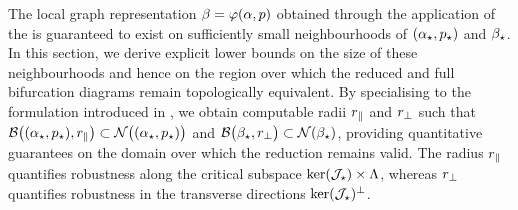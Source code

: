 \documentclass[a4paper]{cas-dc}
\begin{document}
The local graph representation \(\B = \varphi(\A,p)\) obtained through the application of the \ImFT{} is guaranteed to exist on sufficiently small neighbourhoods of \((\A_{\star},p_{\star})\) and \(\B_{\star}\). In this section, we derive explicit lower bounds on the size of these neighbourhoods and hence on the region over which the reduced and full bifurcation diagrams remain topologically equivalent. By specialising  to the \LSR{} formulation introduced in , we obtain computable radii \(\rpr\) and \(\rpp\) such that \(\Bpara[\rpr] \subset \mathcal{N}\bigl((\A_{\star},p_{\star})\bigr)\) and \(\Bperp[\rpp] \subset \mathcal{N}(\B_{\star})\), providing quantitative guarantees on the domain over which the reduction remains valid. The radius \(\rpr\) quantifies robustness along the critical subspace \(\ker(\J) \times \Lambda\), whereas \(\rpp\) quantifies robustness in the transverse directions \(\ker(\J)^{\perp}\).
\end{document}
